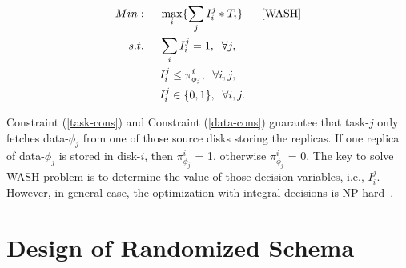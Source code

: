 \documentclass[conference]{IEEEtran}
\begin{document}
\vspace{-0.5cm}
\begin{align}
Min:&\;\;\;\;\;\max\limits_{i}\{\sum_{j}I_i^j*T_i\}\;\;\;\;\;\;[\rm{WASH}]\nonumber\\
s.t. 
&\;\;\;\;\;\sum_{i}I_i^j = 1,\;\;\forall j,\label{task-cons}\\
&\;\;\;\;\;I_i^j \leq \pi_{\phi_j}^{i},\;\;\forall i,j\label{data-cons},\\
&\;\;\;\;\;I_i^j\in\{0,1\},\;\;\forall i,j.\label{def-cons}
\end{align}

Constraint (\ref{task-cons}) and Constraint (\ref{data-cons}) guarantee that task-$j$ only fetches data-$\phi_j$ from one of those source disks storing the replicas. 
If one replica of data-$\phi_j$ is stored in disk-$i$, then $\pi_{\phi_j}^{i}$ = 1, otherwise $\pi_{\phi_j}^{i}$ = 0. 
The key to solve WASH problem is to determine the value of those decision variables, i.e., $I_i^j$. However, in general case, the optimization with integral decisions is NP-hard~\cite{b9}.






\section{Design of Randomized Schema}\label{DESIGN_ALGORITHM}
\end{document}
